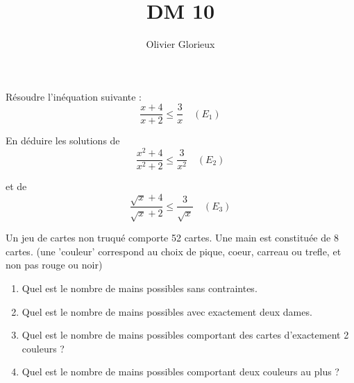 \documentclass[a4paper, 11pt,reqno]{article}
\author{Olivier Glorieux}
\begin{document}
\title{DM 10
}


\begin{exercice}
Résoudre l'inéquation suivante :
$$ \frac{x+4}{x+2} \leq \frac{3}{x} \quad(E_1)$$

En déduire les solutions de 
$$\frac{x^2+4}{x^2+2} \leq \frac{3}{x^2} \quad(E_2)$$

et de
$$\frac{\sqrt{x}+4}{\sqrt{x}+2} \leq \frac{3}{\sqrt{x}}\quad(E_3)$$


\end{exercice}

\begin{exercice}  \;
Un jeu de cartes non truqu\'e comporte 52 cartes. Une main est constitu\'ee de 8 cartes. (une 'couleur' correspond au choix de pique, coeur, carreau ou trefle, et non pas rouge ou noir) 
\begin{enumerate}
\item Quel est le nombre de mains possibles sans contraintes.
\item Quel est le nombre de mains possibles avec exactement deux dames.
\item Quel est le nombre de mains possibles comportant des cartes d'exactement 2 couleurs ?
\item  Quel est le nombre de mains possibles comportant deux couleurs au plus ?

\end{enumerate}
\end{exercice}
\end{document}
